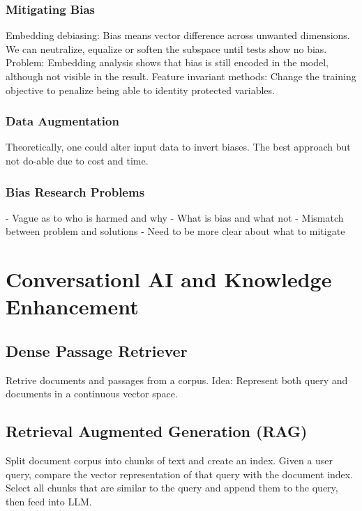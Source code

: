 \documentclass{scrartcl}
\begin{document}
\subsubsection*{Mitigating Bias}
Embedding debiasing: Bias means vector difference across unwanted dimensions. We can neutralize, equalize or soften the subspace until tests show no bias. Problem: Embedding analysis shows that bias is still encoded in the model, although not visible in the result.
Feature invariant methods: Change the training objective to penalize being able to identity protected variables.
\subsubsection*{Data Augmentation}
Theoretically, one could alter input data to invert biases. The best approach but not do-able due to cost and time.
\subsubsection*{Bias Research Problems}
- Vague as to who is harmed and why
- What is bias and what not
- Mismatch between problem and solutions
- Need to be more clear about what to mitigate


\section*{Conversationl AI and Knowledge Enhancement}
\subsection*{Dense Passage Retriever}
Retrive documents and passages from a corpus. Idea: Represent both query and documents in a continuous vector space.

\subsection*{Retrieval Augmented Generation (RAG)}
Split document corpus into chunks of text and create an index.
Given a user query, compare the vector representation of that query with the document index. Select all chunks that are similar to the query and append them to the query, then feed into LLM.
\end{document}

